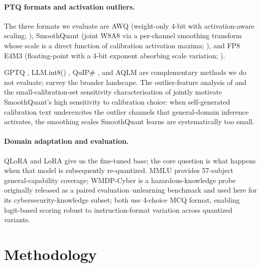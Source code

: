 \documentclass[11pt]{article}
\newcommand{\wmdp}{WMDP-Cyber}
\begin{document}
\paragraph{PTQ formats and activation outliers.}
\begin{sloppypar}
The three formats we evaluate are AWQ (weight-only 4-bit with
activation-aware scaling; \citealp{lin2023awq}), SmoothQuant (joint
W8A8 via a per-channel smoothing transform whose scale is a direct
function of calibration activation maxima; \citealp{xiao2023smoothquant}),
and FP8 E4M3 (floating-point with a 4-bit exponent absorbing scale
variation; \citealp{micikevicius2022fp8}).
\end{sloppypar}  GPTQ
\citep{frantar2022gptq}, LLM.int8() \citep{dettmers2022llmint8},
QuIP\# \citep{tseng2024quip}, and AQLM \citep{egiazarian2024aqlm} are
complementary methods we do not evaluate; \citet{zhu2024survey} survey
the broader landscape.  The outlier-feature analysis of
\citet{dettmers2022llmint8} and the small-calibration-set sensitivity
characterisation of \citet{hubara2021accuratept} jointly motivate
SmoothQuant's high sensitivity to calibration choice: when
self-generated calibration text underexcites the outlier channels that
general-domain inference activates, the smoothing scales SmoothQuant
learns are systematically too small.

\paragraph{Domain adaptation and evaluation.}
\begin{sloppypar}
QLoRA \citep{dettmers2023qlora} and LoRA \citep{hu2021lora} give us
the fine-tuned base; the core question is what happens when that
model is subsequently re-quantized.  MMLU
\citep{hendrycks2021mmlu} provides 57-subject general-capability
coverage; \wmdp{} \citep{li2024wmdp} is a hazardous-knowledge probe
originally released as a paired evaluation--unlearning benchmark and
used here for its cybersecurity-knowledge subset; both
use 4-choice MCQ format, enabling logit-based scoring robust to
instruction-format variation across quantized variants.
\end{sloppypar}

\section{Methodology}
\label{sec:method}
\end{document}
